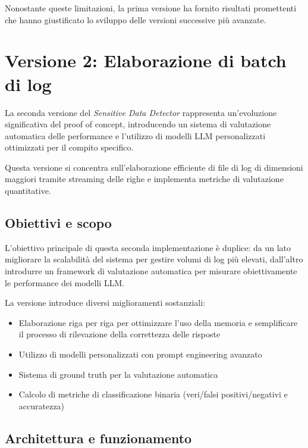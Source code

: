 \documentclass[12pt]{report}
\begin{document}
Nonostante queste limitazioni, la prima versione ha fornito risultati promettenti che hanno giustificato lo sviluppo delle versioni successive più avanzate.

\section{Versione 2: Elaborazione di batch di log}
\label{sec:ver2}

La seconda versione del \textit{Sensitive Data Detector} rappresenta un'evoluzione significativa del proof of concept, introducendo un sistema di valutazione automatica delle performance e l'utilizzo di modelli LLM personalizzati ottimizzati per il compito specifico.

Questa versione si concentra sull'elaborazione efficiente di file di log di dimensioni maggiori tramite streaming delle righe e implementa metriche di valutazione quantitative.

\subsection{Obiettivi e scopo}
\label{subsec:ver2_obiettivi}

L'obiettivo principale di questa seconda implementazione è duplice: da un lato migliorare la scalabilità del sistema per gestire volumi di log più elevati, dall'altro introdurre un framework di valutazione automatica per misurare obiettivamente le performance dei modelli LLM.

La versione introduce diversi miglioramenti sostanziali:
\begin{itemize}
    \item Elaborazione riga per riga per ottimizzare l'uso della memoria e semplificare il processo di rilevazione della correttezza delle risposte
    \item Utilizzo di modelli personalizzati con prompt engineering avanzato
    \item Sistema di ground truth per la valutazione automatica
    \item Calcolo di metriche di classificazione binaria (veri/falsi positivi/negativi e accuratezza)
\end{itemize}

\subsection{Architettura e funzionamento}
\label{subsec:ver2_architettura}
\end{document}
